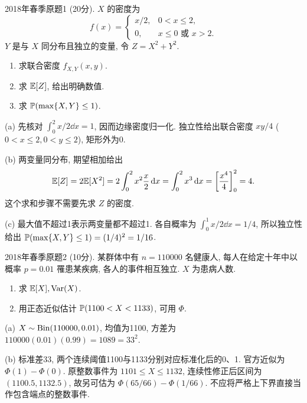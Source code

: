 \begin{exercise}\label{m2:2018s:q1}
2018年春季原题1 (20分). $X$ 的密度为
\[
f(x)=\begin{cases}x/2,&0<x\le2,\\0,&x\le0\text{ 或 }x>2.\end{cases}
\]
$Y$ 是与 $X$ 同分布且独立的变量, 令 $Z=X^2+Y^2$.
\begin{enumerate}
\item[(a)]\label{m2:2018s:q1:a} 求联合密度 $f_{X,Y}(x,y)$.
\item[(b)]\label{m2:2018s:q1:b} 求 $\mathbb E[Z]$, 给出明确数值.
\item[(c)]\label{m2:2018s:q1:c} 求 $\mathbb P(\max\{X,Y\}\le1)$.
\end{enumerate}
\end{exercise}
\begin{solution}
(a) 先核对 $\int_0^2x/2\dd x=1$, 因而边缘密度归一化. 独立性给出联合密度 $xy/4$ ($0<x\le2,0<y\le2$), 矩形外为0.

(b) 两变量同分布, 期望相加给出
\[
\mathbb E[Z]=2\mathbb E[X^2]=2\int_0^2x^2\frac x2\,\mathrm d x=\int_0^2x^3\,\mathrm d x=\left[\frac{x^4}4\right]_0^2=4.
\]
这个求和步骤不需要先求 $Z$ 的密度.

(c) 最大值不超过1表示两变量都不超过1. 各自概率为 $\int_0^1x/2\dd x=1/4$, 所以独立性给出 $\mathbb P(\max\{X,Y\}\le1)=(1/4)^2=1/16$.
\end{solution}

\begin{exercise}\label{m2:2018s:q2}
2018年春季原题2 (10分). 某群体中有 $n=110000$ 名健康人, 每人在给定十年中以概率 $p=0.01$ 罹患某疾病, 各人的事件相互独立. $X$ 为患病人数.
\begin{enumerate}
\item[(a)]\label{m2:2018s:q2:a} 求 $\mathbb E[X],\operatorname{Var}(X)$.
\item[(b)]\label{m2:2018s:q2:b} 用正态近似估计 $\mathbb P(1100<X<1133)$, 可用 $\Phi$.
\end{enumerate}
\end{exercise}
\begin{solution}
(a) $X\sim\operatorname{Bin}(110000,0.01)$, 均值为1100, 方差为 $110000(0.01)(0.99)=1089=33^2$.

(b) 标准差33, 两个连续阈值1100与1133分别对应标准化后的0、1. 官方近似为 $\Phi(1)-\Phi(0)$. 原整数事件为 $1101\le X\le1132$, 连续性修正后区间为 $(1100.5,1132.5)$, 故另可估为 $\Phi(65/66)-\Phi(1/66)$. 不应将严格上下界直接当作包含端点的整数事件.
\end{solution}

